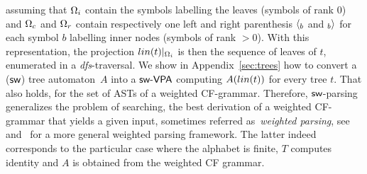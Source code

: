 assuming \eg that $\Omegai$ contain the symbols labelling the leaves (symbols of rank $0$) 
and $\Omegac$ and $\Omegar$ contain respectively one left and right parenthesis
$\langle_{b}$ and $_{b}{\rangle}$ for each symbol $b$ labelling inner nodes (symbols of rank $>0$). 
%
With this representation, the projection $\lin(t)|_\Omegai$ is then the 
sequence of leaves of $t$, enumerated in a \emph{dfs}-traversal. 
%
We show in Appendix~\ref{sec:trees} how to convert a ($\textsf{sw}$) tree automaton~$A$
into a $\textsf{sw-VPA}$ computing $A(\lin(t))$ for every tree $t$. 
That also holds, for the set of ASTs of a weighted CF-grammar.
%
%
%
%
%
%
Therefore, $\textsf{sw}$-parsing generalizes 
the problem of searching, the best derivation of a weighted CF-grammar  
that yields a given input, sometimes referred as~\emph{weighted parsing},
see \eg~\cite{Goodman99SemiringParsing} 
and~\cite{MorbitzVogler19weighted-parsing} for a more general weighted parsing framework.
%
The latter indeed corresponds to the 
particular case where the alphabet is finite, 
$T$ computes identity and $A$ is obtained from the weighted CF grammar.



